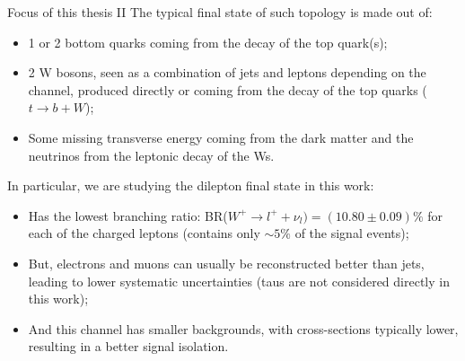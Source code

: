 \documentclass[8pt]{beamer}
\begin{document}
\begin{frame}{Focus of this thesis II}
\justifying
The \alert{typical final state} of such topology is made out of:
\begin{itemize}
\justifying
\item 1 or 2 bottom quarks coming from the decay of the top quark(s);
\item 2 W bosons, seen as a combination of jets and leptons depending on the channel, produced directly or coming from the decay of the top quarks ($t \rightarrow b + W$);
\item Some missing transverse energy coming from the dark matter and the neutrinos from the leptonic decay of the Ws.
\end{itemize} \vfill

In particular, we are studying the \alert{dilepton final state} in this work: 
\begin{itemize}
\justifying
\item Has the lowest branching ratio: BR($W^+ \rightarrow l^+ + \nu_l) = (10.80 \pm 0.09)\%$ for each of the charged leptons (contains only $\sim 5\%$ of the signal events);
\item But, electrons and muons can usually be reconstructed better than jets, leading to lower systematic uncertainties (taus are not considered directly in this work);
\item And this channel has smaller backgrounds, with cross-sections typically lower, resulting in a better signal isolation.
\end{itemize} \vfill

\end{frame}
\end{document}
